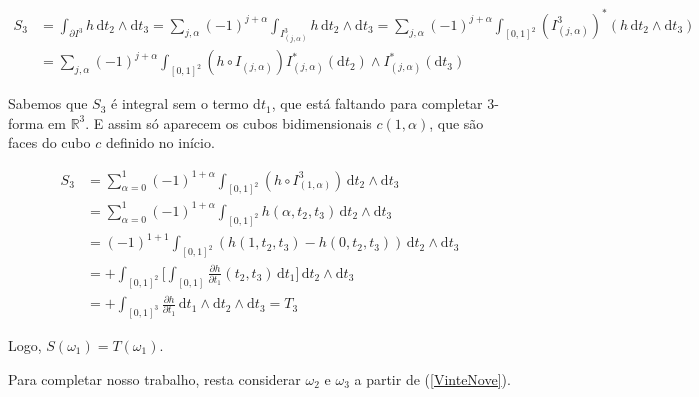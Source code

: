 \documentclass[12pt,a4paper]{article}
\begin{document}
		\begin{align}
			S_3 &= \int_{\partial I^3} h \,\mathrm{d}t_2 \wedge \mathrm{d}t_3 = \sum_{j, \alpha} (-1)^{j + \alpha} \int_{I^3_{(j, \alpha)}} h \,\mathrm{d}t_2 \wedge \mathrm{d}t_3 = \sum_{j, \alpha} (-1)^{j + \alpha} \int_{[0,1]^2} (I_{(j, \alpha)}^{3})^* (h \,\mathrm{d}t_2 \wedge \mathrm{d}t_3) \\
			&= \sum_{j, \alpha} (-1)^{j + \alpha} \int_{[0,1]^2} (h \circ I_{(j, \alpha)}) I^*_{(j, \alpha)} (\mathrm{d}t_2) \wedge I^*_{(j, \alpha)} (\mathrm{d}t_3)
		\end{align}
		
		Sabemos que $S_3$ \'e integral sem o termo d$t_1$, que est\'a faltando para completar 3-forma em $\mathbb{R}^3$. E assim s\'o aparecem os cubos bidimensionais $c(1, \alpha)$, que s\~ao faces do cubo $c$ definido no in\'icio.

		\begin{align}
			S_3 &= \sum_{\alpha = 0}^1 (-1)^{1 + \alpha} \int_{[0,1]^2} (h \circ I^3_{(1, \alpha)}) \,\mathrm{d}t_2 \wedge \mathrm{d}t_3 \\
			&= \sum_{\alpha = 0}^1 (-1)^{1 + \alpha} \int_{[0,1]^2} h(\alpha, t_2, t_3) \,\mathrm{d}t_2 \wedge \mathrm{d}t_3 \\
			&= (-1)^{1 + 1} \int_{[0,1]^2} (h(1, t_2, t_3) - h(0, t_2, t_3)) \,\mathrm{d}t_2 \wedge \mathrm{d}t_3 \\
			&= + \int_{[0,1]^2} \biggl[ \int_{[0,1]} \frac{\partial h}{\partial t_1} (t_2, t_3) \,\mathrm{d}t_1 \biggl] \,\mathrm{d}t_2 \wedge \mathrm{d}t_3 \\
			&= + \int_{[0,1]^3} \frac{\partial h}{\partial t_1} \,\mathrm{d}t_1 \wedge \mathrm{d}t_2 \wedge \mathrm{d}t_3 = T_3
		\end{align}		
		
		Logo, $S(\omega_1) = T(\omega_1)$. 
		
		Para completar nosso trabalho, resta considerar $\omega_2$ e $\omega_3$ a partir de (\ref{VinteNove}).
		
\end{document}
